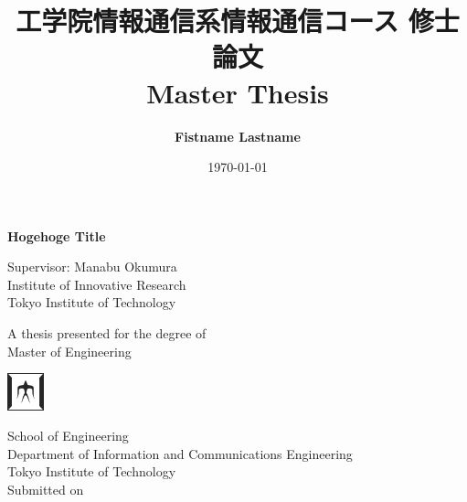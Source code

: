\begin{titlepage}
    \title{\textbf{{\Large 工学院情報通信系情報通信コース 修士論文\\Master Thesis}}}
    \author{}
    \date{}
    \maketitle
    \thispagestyle{empty}
    \begin{center}
        \vspace{1.5cm}
        \textbf{{\Large Hogehoge Title}}
            
        \vspace{4cm}
        \author{\textbf{{\large{Fistname Lastname}}}}

        \vspace{1.5cm}
        Supervisor: Manabu Okumura\\
        Institute of Innovative Research\\
        Tokyo Institute of Technology
        \vfill
            
        A thesis presented for the degree of\\
        Master of Engineering
        \vspace{0.8cm}
     
        \includegraphics[width=0.08\textwidth]{figures/titech-logo.png}
        
        School of Engineering\\
        Department of Information and Communications Engineering\\
        Tokyo Institute of Technology\\
        \vspace{0.8cm}
        Submitted on \date{\today}
   \end{center}
\end{titlepage}
